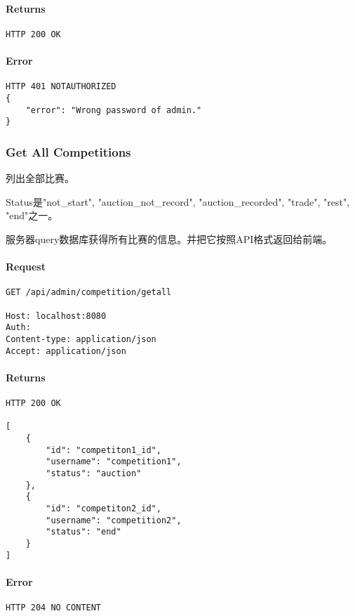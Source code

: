 \documentclass{article}
\begin{document}
\paragraph*{Returns}
\begin{lstlisting}
HTTP 200 OK

\end{lstlisting}

\paragraph*{Error}
\begin{lstlisting}
HTTP 401 NOTAUTHORIZED
{
    "error": "Wrong password of admin."
}
\end{lstlisting}


\subsubsection{Get All Competitions}

列出全部比赛。

Status是"not\_start", "auction\_not\_record", "auction\_recorded", "trade", "rest", "end"之一。

服务器query数据库获得所有比赛的信息。并把它按照API格式返回给前端。

\paragraph*{Request}
\begin{lstlisting}
GET /api/admin/competition/getall

Host: localhost:8080
Auth:
Content-type: application/json
Accept: application/json
\end{lstlisting}

\paragraph*{Returns}
\begin{lstlisting}
HTTP 200 OK

[
    {
        "id": "competiton1_id",
        "username": "competition1",
        "status": "auction"
    },
    {
        "id": "competiton2_id",
        "username": "competition2",
        "status": "end"
    }
]
\end{lstlisting}

\paragraph*{Error}
\begin{lstlisting}
HTTP 204 NO CONTENT
\end{lstlisting}
\end{document}
